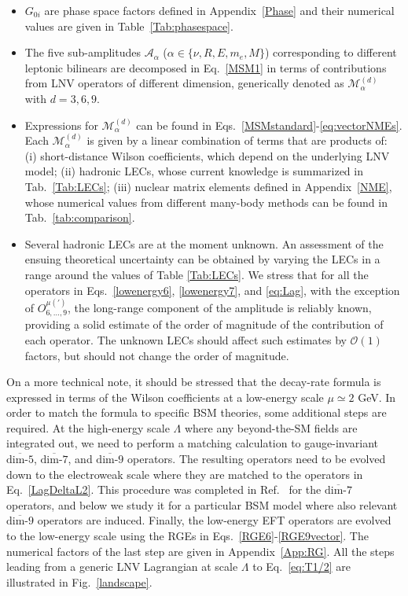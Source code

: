 \documentclass[letterpaper,11pt]{article}
\newcommand{\textoverline}[1]{$\overline{\mbox{#1}}$}
\begin{document}
\begin{itemize}
\item  $G_{0i}$ are phase space factors defined in Appendix~\ref{Phase} and  their numerical values are given in Table~\ref{Tab:phasespace}. 

\item The five  sub-amplitudes ${\mathcal A}_\alpha$  ($\alpha \in \{ \nu,R,E,m_e,M \}$) corresponding to different leptonic bilinears are decomposed 
in Eq.~\eqref{MSM1}  in terms of contributions from LNV operators of different dimension,  generically denoted as ${\mathcal M}_{\alpha}^{(d)}$  with $d=3,6,9$. 

\item  Expressions for  ${\mathcal M}_{\alpha}^{(d)}$  can be found in Eqs.~\eqref{MSMstandard}-\eqref{eq:vectorNMEs}.  
Each  ${\mathcal M}_{\alpha}^{(d)}$ is given by a linear combination of terms that are products of: 
(i) short-distance Wilson coefficients,  which depend on the underlying LNV model;
(ii)  hadronic LECs,   whose current knowledge is summarized in Tab.~\ref{Tab:LECs};
(iii)  nuclear matrix elements  defined in Appendix~\ref{NME},    whose numerical values from different many-body methods  can be found in Tab.~\ref{tab:comparison}.


\item 
Several hadronic LECs are at the moment unknown. An assessment  of the ensuing theoretical uncertainty can
be obtained by varying the LECs in a range around the values of Table \ref{Tab:LECs}.  We stress that for all the operators in Eqs.\ \eqref{lowenergy6}, \eqref{lowenergy7}, and \eqref{eq:Lag}, with the exception of  $O^{\mu (\prime)}_{6,\ldots,9}$, the long-range component of the amplitude is reliably known, providing a solid estimate of the order of magnitude of the contribution of each operator.
The unknown LECs should affect such estimates by $\mathcal O(1)$ factors, but should not change the order of magnitude.



\end{itemize}


On a more technical note, it should be stressed that the decay-rate formula is expressed in terms of the Wilson coefficients at a low-energy scale $\mu \simeq 2$ GeV. In order to match the formula to specific BSM theories, some additional steps are required. At the high-energy scale $\Lambda$ where any beyond-the-SM fields are integrated out, we need to perform a matching calculation to gauge-invariant \textoverline{dim-5}, \textoverline{dim-7}, and \textoverline{dim-9} operators. The resulting operators need to be evolved down to the electroweak scale where they are matched to the operators in Eq.~\eqref{LagDeltaL2}. This procedure was completed  in Ref.~\cite{Cirigliano:2017djv} for the \textoverline{dim-7} operators, and below we study it for a particular BSM model where also relevant \textoverline{dim-9} operators are induced.   Finally, the low-energy EFT operators are evolved to the low-energy scale using the RGEs in Eqs.~\eqref{RGE6}-\eqref{RGE9vector}. The numerical factors of the last step are given in Appendix~\ref{App:RG}.
All the steps leading from  a generic LNV Lagrangian at scale $\Lambda$  to Eq.~\eqref{eq:T1/2} are illustrated in Fig.~\ref{landscape}.
\end{document}
